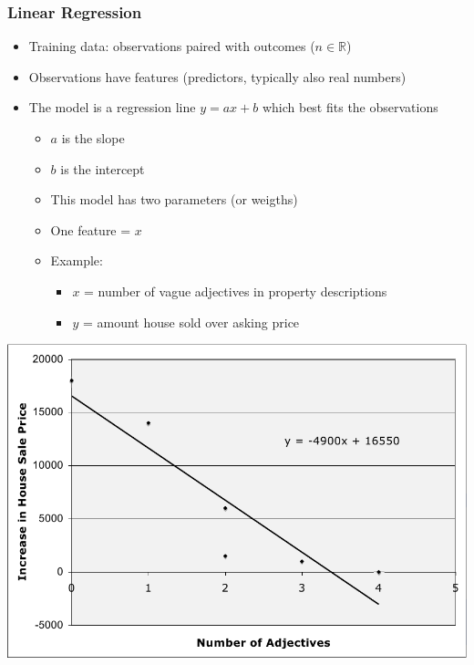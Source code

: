 \documentclass[14pt,mathserif,dvipsnames,usenames]{beamer}
\newcommand{\voc}[1]{{\color{ForestGreen}#1}}
\begin{document}
\begin{frame}
\frametitle{Linear Regression}
 \begin{itemize}
 \item Training data: observations paired with outcomes ($n \in
   \mathbb{R}$)
 \item Observations have features (predictors, typically also real
   numbers)
 \item The model is a \voc{regression line} $y = ax + b$ which best
   fits the observations
   \begin{itemize}
   \item $a$ is the \voc{slope}
   \item $b$ is the \voc{intercept}
   \item This model has two parameters (or weigths)
   \item One feature = $x$ 
   \item Example: \begin{itemize}
     \item $x$ = number of vague adjectives in property
       descriptions
     \item $y$ = amount house sold over asking price
     \end{itemize}
   \end{itemize}
 \end{itemize}
\end{frame}

\begin{frame}
\begin{center}
\includegraphics[scale=0.3]{regressionjm.png}

\end{center}
\end{frame}
\end{document}
